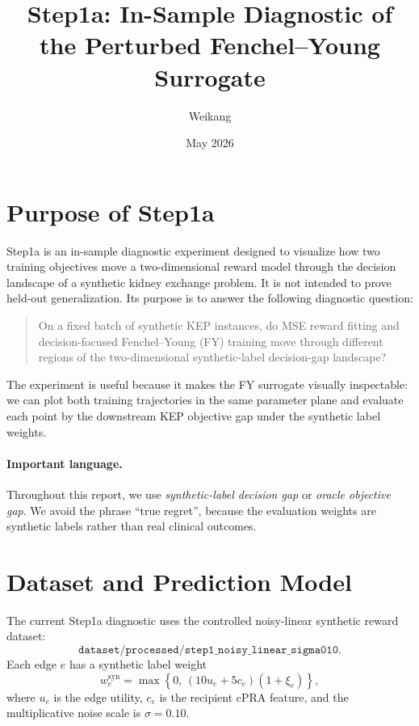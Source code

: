 \documentclass[11pt]{article}
\title{Step1a: In-Sample Diagnostic of the Perturbed Fenchel--Young Surrogate}
\author{Weikang}
\date{May 2026}
\begin{document}
\maketitle

\section{Purpose of Step1a}

Step1a is an in-sample diagnostic experiment designed to visualize how two
training objectives move a two-dimensional reward model through the decision
landscape of a synthetic kidney exchange problem. It is not intended to prove
held-out generalization. Its purpose is to answer the following diagnostic
question:

\begin{quote}
On a fixed batch of synthetic KEP instances, do MSE reward fitting and
decision-focused Fenchel--Young (FY) training move through different regions of
the two-dimensional synthetic-label decision-gap landscape?
\end{quote}

The experiment is useful because it makes the FY surrogate visually inspectable:
we can plot both training trajectories in the same parameter plane and evaluate
each point by the downstream KEP objective gap under the synthetic label weights.

\paragraph{Important language.}
Throughout this report, we use \emph{synthetic-label decision gap} or
\emph{oracle objective gap}. We avoid the phrase ``true regret'', because the
evaluation weights are synthetic labels rather than real clinical outcomes.

\section{Dataset and Prediction Model}

The current Step1a diagnostic uses the controlled noisy-linear synthetic reward
dataset:
\[
    \texttt{dataset/processed/step1\_noisy\_linear\_sigma010}.
\]
Each edge \(e\) has a synthetic label weight
\[
    w^{\mathrm{syn}}_e
    =
    \max\left\{0,\,
    (10u_e + 5c_e)(1+\xi_e)
    \right\},
\]
where \(u_e\) is the edge utility, \(c_e\) is the recipient cPRA feature, and the
multiplicative noise scale is \(\sigma=0.10\).
\end{document}
